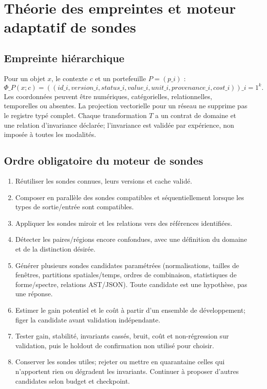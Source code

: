 \documentclass[11pt,a4paper,oneside]{report}
\begin{document}
\chapter{Théorie des empreintes et moteur adaptatif de sondes}
\section{Empreinte hiérarchique}
Pour un objet $x$, le contexte $c$ et un portefeuille $P=(p\_i)$ :
\[
 \Phi\_P(x;c)=((id\_i, version\_i, status\_i, value\_i, unit\_i, provenance\_i, cost\_i))\_{i=1}^{k}.
\]
Les coordonnées peuvent être numériques, catégorielles, relationnelles, temporelles ou absentes. La projection vectorielle pour un réseau ne supprime pas le registre typé complet. Chaque transformation $T$ a un contrat de domaine et une relation d'invariance déclarée; l'invariance est validée par expérience, non imposée à toutes les modalités.

\section{Ordre obligatoire du moteur de sondes}
\begin{enumerate}
\item Réutiliser les sondes connues, leurs versions et cache validé.
\item Composer en parallèle des sondes compatibles et séquentiellement lorsque les types de sortie/entrée sont compatibles.
\item Appliquer les sondes miroir et les relations vers des références identifiées.
\item Détecter les paires/régions encore confondues, avec une définition du domaine et de la distinction désirée.
\item Générer plusieurs sondes candidates paramétrées (normalisations, tailles de fenêtres, partitions spatiales/temps, ordres de combinaison, statistiques de forme/spectre, relations AST/JSON). Toute candidate est une hypothèse, pas une réponse.
\item Estimer le gain potentiel et le coût à partir d'un ensemble de développement; figer la candidate avant validation indépendante.
\item Tester gain, stabilité, invariants cassés, bruit, coût et non-régression sur validation, puis le holdout de confirmation non utilisé pour choisir.
\item Conserver les sondes utiles; rejeter ou mettre en quarantaine celles qui n'apportent rien ou dégradent les invariants. Continuer à proposer d'autres candidates selon budget et checkpoint.
\end{enumerate}
\end{document}
